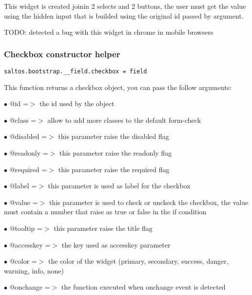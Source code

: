 \documentclass[a4paper]{article}
\begin{document}
This widget is created joinin 2 selects and 2 buttons, the user must get the value
using the hidden input that is builded using the original id passed by argument.

TODO: detected a bug with this widget in chrome in mobile browsers

\hypertarget{toc623}{}
\subsubsection{Checkbox constructor helper}

\begin{lstlisting}
saltos.bootstrap.__field.checkbox = field
\end{lstlisting}

This function returns a checkbox object, you can pass the follow arguments:

\begin{compactitem}
\item[\color{myblue}$\bullet$] @id        =$>$ the id used by the object
\item[\color{myblue}$\bullet$] @class     =$>$ allow to add more classes to the default form-check
\item[\color{myblue}$\bullet$] @disabled  =$>$ this parameter raise the disabled flag
\item[\color{myblue}$\bullet$] @readonly  =$>$ this parameter raise the readonly flag
\item[\color{myblue}$\bullet$] @required  =$>$ this parameter raise the required flag
\item[\color{myblue}$\bullet$] @label     =$>$ this parameter is used as label for the checkbox
\item[\color{myblue}$\bullet$] @value     =$>$ this parameter is used to check or unckeck the checkbox, the value
              must contain a number that raise as true or false in the if condition
\item[\color{myblue}$\bullet$] @tooltip   =$>$ this parameter raise the title flag
\item[\color{myblue}$\bullet$] @accesskey =$>$ the key used as accesskey parameter
\item[\color{myblue}$\bullet$] @color     =$>$ the color of the widget (primary, secondary, success, danger, warning, info, none)
\item[\color{myblue}$\bullet$] @onchange  =$>$ the function executed when onchange event is detected
\end{compactitem}
\end{document}
